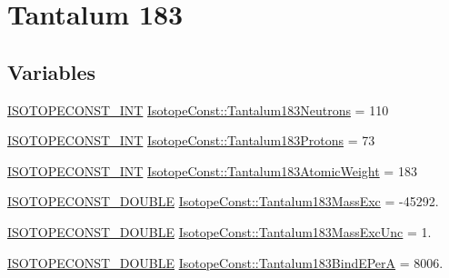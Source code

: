 \hypertarget{group___isotope_const-_tantalum-_ta183}{}\section{Tantalum 183}
\label{group___isotope_const-_tantalum-_ta183}
\subsection*{Variables}
\begin{DoxyCompactItemize}
\item 
\mbox{\hyperlink{group___isotope_const-_macros_ga5f18360b3e99483a35c32d789e62621c}{I\+S\+O\+T\+O\+P\+E\+C\+O\+N\+S\+T\+\_\+\+I\+NT}} \mbox{\hyperlink{group___isotope_const-_tantalum-_ta183_ga2ffb1055ad1d2e7b3c294dd1067ef330}{Isotope\+Const\+::\+Tantalum183\+Neutrons}} = 110
\item 
\mbox{\hyperlink{group___isotope_const-_macros_ga5f18360b3e99483a35c32d789e62621c}{I\+S\+O\+T\+O\+P\+E\+C\+O\+N\+S\+T\+\_\+\+I\+NT}} \mbox{\hyperlink{group___isotope_const-_tantalum-_ta183_gab05377fd925254fa197d9aff8fe14225}{Isotope\+Const\+::\+Tantalum183\+Protons}} = 73
\item 
\mbox{\hyperlink{group___isotope_const-_macros_ga5f18360b3e99483a35c32d789e62621c}{I\+S\+O\+T\+O\+P\+E\+C\+O\+N\+S\+T\+\_\+\+I\+NT}} \mbox{\hyperlink{group___isotope_const-_tantalum-_ta183_ga504254223459fe2f657dfc96d4694d39}{Isotope\+Const\+::\+Tantalum183\+Atomic\+Weight}} = 183
\item 
\mbox{\hyperlink{group___isotope_const-_macros_ga8f45a7272ce02c0b4c65c44636ed719a}{I\+S\+O\+T\+O\+P\+E\+C\+O\+N\+S\+T\+\_\+\+D\+O\+U\+B\+LE}} \mbox{\hyperlink{group___isotope_const-_tantalum-_ta183_gad7df47ce3e4190470bb885b04a2fb468}{Isotope\+Const\+::\+Tantalum183\+Mass\+Exc}} = -\/45292.
\item 
\mbox{\hyperlink{group___isotope_const-_macros_ga8f45a7272ce02c0b4c65c44636ed719a}{I\+S\+O\+T\+O\+P\+E\+C\+O\+N\+S\+T\+\_\+\+D\+O\+U\+B\+LE}} \mbox{\hyperlink{group___isotope_const-_tantalum-_ta183_gab6f758bc7dbd6ee2e32ec575bead9990}{Isotope\+Const\+::\+Tantalum183\+Mass\+Exc\+Unc}} = 1.
\item 
\mbox{\hyperlink{group___isotope_const-_macros_ga8f45a7272ce02c0b4c65c44636ed719a}{I\+S\+O\+T\+O\+P\+E\+C\+O\+N\+S\+T\+\_\+\+D\+O\+U\+B\+LE}} \mbox{\hyperlink{group___isotope_const-_tantalum-_ta183_ga821cc001dca6d79c78b818ac01255745}{Isotope\+Const\+::\+Tantalum183\+Bind\+E\+PerA}} = 8006.
\item 

\end{DoxyCompactItemize}
